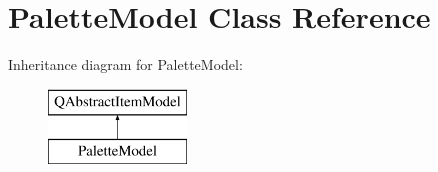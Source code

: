 \hypertarget{class_palette_model}{}\section{Palette\+Model Class Reference}
\label{class_palette_model}
Inheritance diagram for Palette\+Model\+:\begin{figure}[H]
\begin{center}
\leavevmode
\includegraphics[height=2.000000cm]{d9/dae/class_palette_model}
\end{center}
\end{figure}
